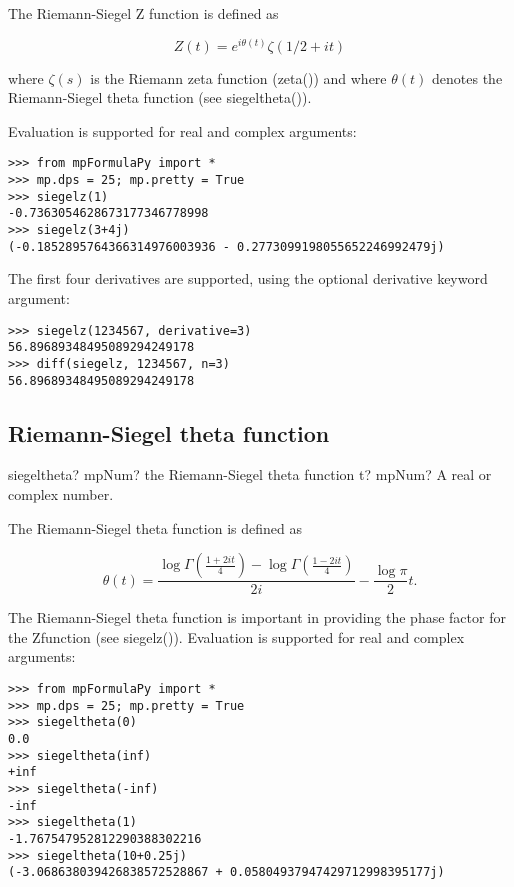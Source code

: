 \vpara
The Riemann-Siegel Z function is defined as

\begin{equation}
Z(t) = e^{i\theta(t)} \zeta(1/2+it)
\end{equation}

where $\zeta(s) $ is the Riemann zeta function (zeta()) and where $\theta(t)$ denotes the Riemann-Siegel theta function (see siegeltheta()).

Evaluation is supported for real and complex arguments:

\begin{lstlisting}
>>> from mpFormulaPy import *
>>> mp.dps = 25; mp.pretty = True
>>> siegelz(1)
-0.7363054628673177346778998
>>> siegelz(3+4j)
(-0.1852895764366314976003936 - 0.2773099198055652246992479j)
\end{lstlisting}

The first four derivatives are supported, using the optional derivative keyword argument:

\begin{lstlisting}
>>> siegelz(1234567, derivative=3)
56.89689348495089294249178
>>> diff(siegelz, 1234567, n=3)
56.89689348495089294249178
\end{lstlisting}


\subsection{Riemann-Siegel theta function}

\begin{mpFunctionsExtract}
	\mpFunctionOne
	{siegeltheta? mpNum? the Riemann-Siegel theta function}
	{t? mpNum? A real or complex number.}
\end{mpFunctionsExtract}

\vpara
The Riemann-Siegel theta function is defined as

\begin{equation}
\theta(t) = \frac{\log\Gamma(\frac{1+2it}{4}) - \log\Gamma(\frac{1-2it}{4})}{2i} - \frac{\log \pi}{2} t.
\end{equation}

The Riemann-Siegel theta function is important in providing the phase factor for the Zfunction (see siegelz()). Evaluation is supported for real and complex arguments:

\begin{lstlisting}
>>> from mpFormulaPy import *
>>> mp.dps = 25; mp.pretty = True
>>> siegeltheta(0)
0.0
>>> siegeltheta(inf)
+inf
>>> siegeltheta(-inf)
-inf
>>> siegeltheta(1)
-1.767547952812290388302216
>>> siegeltheta(10+0.25j)
(-3.068638039426838572528867 + 0.05804937947429712998395177j)
\end{lstlisting}

